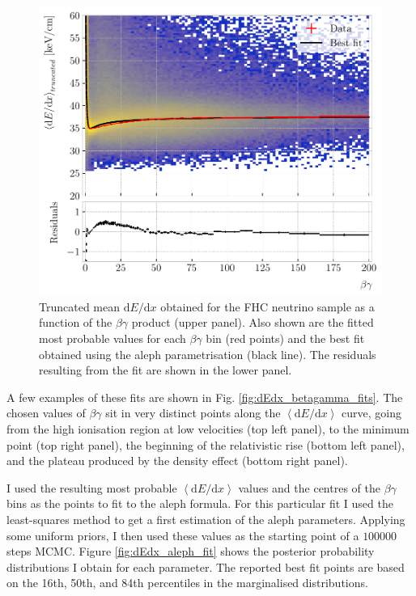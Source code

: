 \begin{figure}[t]
	\centering
	\includegraphics[width=.85\linewidth]{Images/GArSoft_PID/dEdx/dEdx_aleph_data_with_fit.pdf}
	\caption[Truncated mean $\mathrm{d}E/\mathrm{d}x$ obtained for the FHC neutrino sample as a function of the $\beta\gamma$ product, together with the fitted most probable values for each $\beta\gamma$ bin and the best fit obtained using the \gls{aleph} parametrisation.]{Truncated mean $\mathrm{d}E/\mathrm{d}x$ obtained for the FHC neutrino sample as a function of the $\beta\gamma$ product (upper panel). Also shown are the fitted most probable values for each $\beta\gamma$ bin (red points) and the best fit obtained using the \gls{aleph} parametrisation (black line). The residuals resulting from the fit are shown in the lower panel.}
	\label{fig:dEdx_betagamma_aleph}
\end{figure}

A few examples of these fits are shown in Fig. \ref{fig:dEdx_betagamma_fits}. The chosen values of $\beta\gamma$ sit in very distinct points along the $\left<\mathrm{d}E/\mathrm{d}x\right>$ curve, going from the high ionisation region at low velocities (top left panel), to the minimum point (top right panel), the beginning of the relativistic rise (bottom left panel), and the plateau produced by the density effect (bottom right panel).

I used the resulting most probable $\left<\mathrm{d}E/\mathrm{d}x\right>$ values and the centres of the $\beta\gamma$ bins as the points to fit to the \gls{aleph} formula. For this particular fit I used the least-squares method to get a first estimation of the \gls{aleph} parameters. Applying some uniform priors, I then used these values as the starting point of a $100000$ steps MCMC. Figure \ref{fig:dEdx_aleph_fit} shows the posterior probability distributions I obtain for each parameter. The reported best fit points are based on the 16th, 50th, and 84th percentiles in the marginalised distributions.

